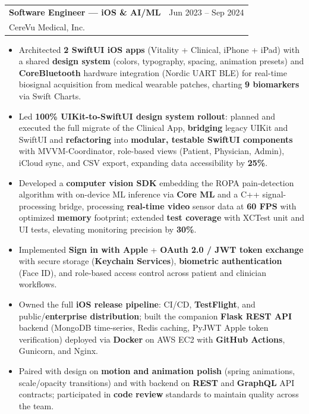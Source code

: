 \documentclass[10.5pt,letterpaper]{article}
\makeatletter
\newcommand{\cventry}[5]{%
  \noindent\begin{tabularx}{\textwidth}{@{}X r@{}}
    {\bfseries\color{headerblue}#2} & {\color{graytext}#1} \\
    {\color{accentcolor}#3}\enskip{\color{lightgray}#4} & \\
  \end{tabularx}%
  \vspace{0.02em}%
  #5%
  \vspace{0.15em}%
}
\makeatother
\begin{document}
\cventry{Jun 2023 -- Sep 2024}{Software Engineer --- iOS \& AI/ML}{CereVu Medical, Inc.}{San Francisco Bay Area, CA}{
\begin{itemize}[leftmargin=0.4cm, itemsep=0.02cm, topsep=0.05cm, label={\color{goldaccent}\textbullet}]
  \item Architected \textbf{2 SwiftUI iOS apps} (Vitality + Clinical, iPhone + iPad) with a shared \textbf{design system} (colors, typography, spacing, animation presets) and \textbf{CoreBluetooth} hardware integration (Nordic UART BLE) for real-time biosignal acquisition from medical wearable patches, charting \textbf{9 biomarkers} via Swift Charts.
  \item Led \textbf{100\% UIKit-to-SwiftUI design system rollout}: planned and executed the full migrate of the Clinical App, \textbf{bridging} legacy UIKit and SwiftUI and \textbf{refactoring} into \textbf{modular, testable SwiftUI components} with MVVM-Coordinator, role-based views (Patient, Physician, Admin), iCloud sync, and CSV export, expanding data accessibility by \textbf{25\%}.
  \item Developed a \textbf{computer vision SDK} embedding the ROPA pain-detection algorithm with on-device ML inference via \textbf{Core ML} and a C++ signal-processing bridge, processing \textbf{real-time video} sensor data at \textbf{60 FPS} with optimized \textbf{memory} footprint; extended \textbf{test coverage} with XCTest unit and UI tests, elevating monitoring precision by \textbf{30\%}.
  \item Implemented \textbf{Sign in with Apple} + \textbf{OAuth 2.0 / JWT token exchange} with secure storage (\textbf{Keychain Services}), \textbf{biometric authentication} (Face ID), and role-based access control across patient and clinician workflows.
  \item Owned the full \textbf{iOS release pipeline}: CI/CD, \textbf{TestFlight}, and public/\textbf{enterprise distribution}; built the companion \textbf{Flask REST API} backend (MongoDB time-series, Redis caching, PyJWT Apple token verification) deployed via \textbf{Docker} on AWS EC2 with \textbf{GitHub Actions}, Gunicorn, and Nginx.
  \item Paired with design on \textbf{motion and animation polish} (spring animations, scale/opacity transitions) and with backend on \textbf{REST} and \textbf{GraphQL} API contracts; participated in \textbf{code review} standards to maintain quality across the team.
\end{itemize}
}
\end{document}
